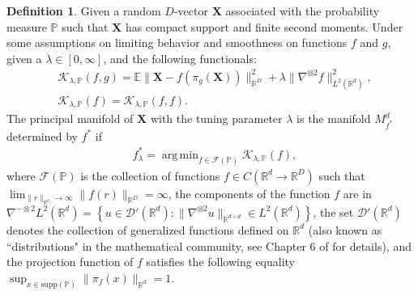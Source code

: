 \documentclass[11pt,reqno]{article}
\DeclareMathOperator*{\argmin}{arg\,min}
\theoremstyle{definition}
\newtheorem{definition}{Definition}
\begin{document}
\begin{definition}
  \label{def:principal_manifolds}
  Given a random $D$-vector $\boldsymbol{X}$ associated with the probability measure $\mathbb{P}$ such that $\boldsymbol{X}$ has compact support and finite second moments. Under some assumptions on limiting behavior and smoothness on functions $f$ and  $g$, given a $\lambda \in [0, \infty]$, and the following functionals:
  \begin{align}\label{eq:5}
&\mathcal{K}_{\lambda, \mathbb{P}}(f, g) = \mathbb{E}\|\boldsymbol{X} - f(\pi_g(\boldsymbol{X}))\|_{\mathbb{R}^{D}}^2 + \lambda\|\nabla^{\otimes 2}f\|_{L^2(\mathbb{R}^{d})}^2, \\
&\mathcal{K}_{\lambda, \mathbb{P}}(f) = \mathcal{K}_{\lambda, \mathbb{P}}(f, f). \nonumber
  \end{align}
  The principal manifold of $\boldsymbol{X}$ with the tuning parameter $\lambda$ is the manifold $M_{f^{*}}^{d}$ determined by $f^{*}$ if
  \begin{equation}\nonumber
    \begin{aligned}
        & f_{\lambda}^{*} = \argmin_{f \in \mathcal{F}(\mathbb{P})}\mathcal{K}_{\lambda, \mathbb{P}}(f),
    \end{aligned}
  \end{equation}
where $\mathcal{F}(\mathbb{P})$ is the collection of functions $f \in C(\mathbb{R}^{d} \to \mathbb{R}^{D})$ such that $\lim_{\|r\|_{\mathbb{R}^{d}} \to \infty}\|f(r)\|_{\mathbb{R}^{D}} = \infty$, the components of the function $f$ are in $\nabla^{-\otimes 2}L^2(\mathbb{R}^{d}) = \left\{u \in \mathcal{D}'(\mathbb{R}^{d}): \|\nabla^{\otimes 2} u\|_{\mathbb{R}^{d \times d}} \in L^2(\mathbb{R}^{d})\right\}$, the set $\mathcal{D}'(\mathbb{R}^d)$ denotes the collection of generalized functions defined on $\mathbb{R}^d$ (also known as ``distributions" in the mathematical community, see Chapter 6 of \cite{rudin1991functional} for details), and the projection function of $f$ satisfies the following equality $\sup_{x \in \text{supp}(\mathbb{P})}\|\pi_f(x)\|_{\mathbb{R}^{d}} = 1$.
\end{definition}
\end{document}
